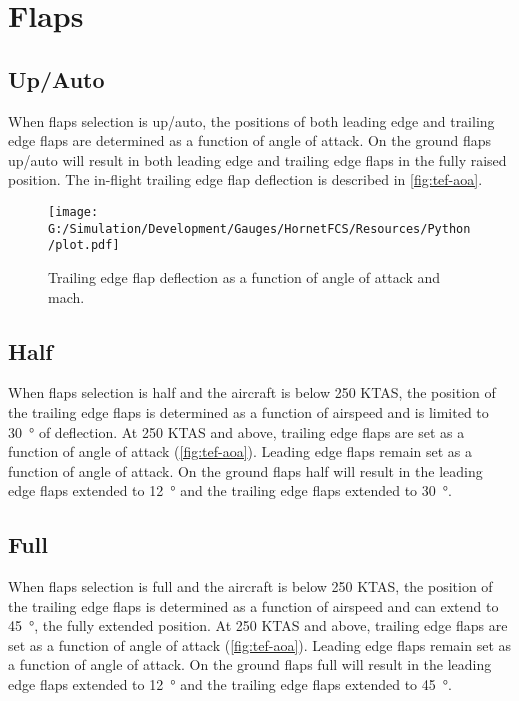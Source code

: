 \documentclass[11pt]{report}
\begin{document}
\section{Flaps}

\subsection{Up/Auto}

When flaps selection is up/auto, the positions of both leading edge and trailing edge flaps are determined as a function of angle of attack.  On the ground flaps up/auto will result in both leading edge and trailing edge flaps in the fully raised position.  The in-flight trailing edge flap deflection is described in \autoref{fig:tef-aoa}.

\begin{figure}[H]
    \centering
    \texttt{[image: G:/Simulation/Development/Gauges/HornetFCS/Resources/Python/plot.pdf]}
    \caption{Trailing edge flap deflection as a function of angle of attack and mach.}
    \label{fig:tef-aoa}
\end{figure}

\subsection{Half}

When flaps selection is half and the aircraft is below 250 KTAS, the position of the trailing edge flaps is determined as a function of airspeed and is limited to \SI{30}{\degree} of deflection.  At 250 KTAS and above, trailing edge flaps are set as a function of angle of attack (\autoref{fig:tef-aoa}).  Leading edge flaps remain set as a function of angle of attack.  On the ground flaps half will result in the leading edge flaps extended to \SI{12}{\degree} and the trailing edge flaps extended to \SI{30}{\degree}.

\subsection{Full}

When flaps selection is full and the aircraft is below 250 KTAS, the position of the trailing edge flaps is determined as a function of airspeed and can extend to \SI{45}{\degree}, the fully extended position.  At 250 KTAS and above, trailing edge flaps are set as a function of angle of attack (\autoref{fig:tef-aoa}).  Leading edge flaps remain set as a function of angle of attack.  On the ground flaps full will result in the leading edge flaps extended to \SI{12}{\degree} and the trailing edge flaps extended to \SI{45}{\degree}.
\end{document}
